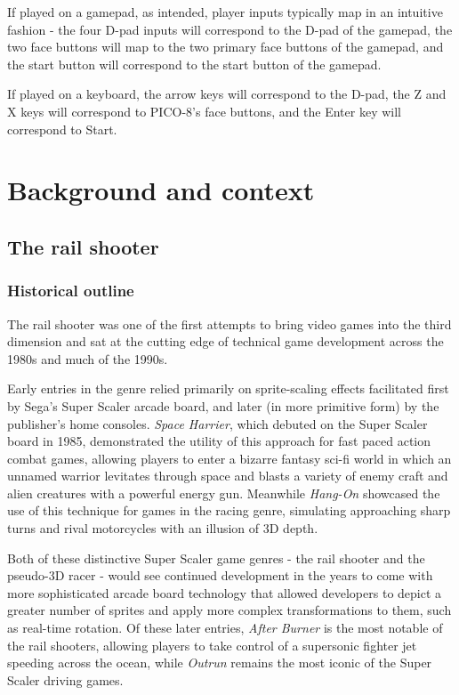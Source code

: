 \documentclass[11pt]{article}
\begin{document}
If played on a gamepad, as intended, player inputs typically map in an intuitive fashion - the four D-pad inputs
will correspond to the D-pad of the gamepad, the two face buttons will map to the two primary face buttons of
the gamepad, and the start button will correspond to the start button of the gamepad.

If played on a keyboard, the arrow keys will correspond to the D-pad, the Z and X keys will correspond to
PICO-8's face buttons, and the Enter key will correspond to Start.

\section{Background and context}

\subsection{The rail shooter}\label{genre}

\subsubsection*{Historical outline}
The rail shooter was one of the first attempts to bring video games into the third dimension and sat at the cutting
edge of technical game development across the 1980s and much of the 1990s.

Early entries in the genre relied primarily
on sprite-scaling effects facilitated first by Sega's Super Scaler arcade board, and later (in more primitive form) by the publisher's
home consoles. \textit{Space Harrier}\cite{space_harrier}, which debuted on the Super Scaler board in 1985, demonstrated
the utility of this approach for fast paced action combat games, allowing players to enter a bizarre
fantasy sci-fi world in which an unnamed warrior levitates through space and blasts a variety of
enemy craft and alien creatures with a powerful energy gun. Meanwhile \textit{Hang-On} showcased the use of this technique
for games in the racing genre, simulating approaching sharp turns and rival motorcycles with an illusion
of 3D depth.

Both of these distinctive Super Scaler game genres - the rail shooter and the pseudo-3D
racer - would see continued development in the years to come with more sophisticated arcade board
technology that allowed developers to depict a greater number of sprites and apply more complex
transformations to them, such as real-time rotation. Of these later entries, \textit{After Burner} is the
most notable of the rail shooters, allowing players to take control of a supersonic fighter jet speeding
across the ocean, while \textit{Outrun} remains the most iconic of the Super Scaler driving games.
\end{document}
